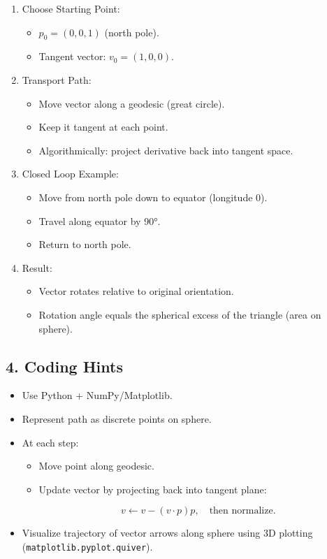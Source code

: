 \documentclass[
  letterpaper,
  DIV=11,
  numbers=noendperiod]{scrreprt}
\providecommand{\tightlist}{%
  \setlength{\itemsep}{0pt}\setlength{\parskip}{0pt}}
\begin{document}
\begin{enumerate}
\def\labelenumi{\arabic{enumi}.}
\item
  Choose Starting Point:

  \begin{itemize}
  \tightlist
  \item
    \(p_0 = (0,0,1)\) (north pole).
  \item
    Tangent vector: \(v_0 = (1,0,0)\).
  \end{itemize}
\item
  Transport Path:

  \begin{itemize}
  \tightlist
  \item
    Move vector along a geodesic (great circle).
  \item
    Keep it tangent at each point.
  \item
    Algorithmically: project derivative back into tangent space.
  \end{itemize}
\item
  Closed Loop Example:

  \begin{itemize}
  \tightlist
  \item
    Move from north pole down to equator (longitude 0).
  \item
    Travel along equator by 90°.
  \item
    Return to north pole.
  \end{itemize}
\item
  Result:

  \begin{itemize}
  \tightlist
  \item
    Vector rotates relative to original orientation.
  \item
    Rotation angle equals the spherical excess of the triangle (area on
    sphere).
  \end{itemize}
\end{enumerate}

\subsection{4. Coding Hints}\label{coding-hints-3}

\begin{itemize}
\item
  Use Python + NumPy/Matplotlib.
\item
  Represent path as discrete points on sphere.
\item
  At each step:

  \begin{itemize}
  \item
    Move point along geodesic.
  \item
    Update vector by projecting back into tangent plane:

    \[
    v \gets v - (v \cdot p)p, \quad \text{then normalize}.
    \]
  \end{itemize}
\item
  Visualize trajectory of vector arrows along sphere using 3D plotting
  (\texttt{matplotlib.pyplot.quiver}).
\end{itemize}
\end{document}
